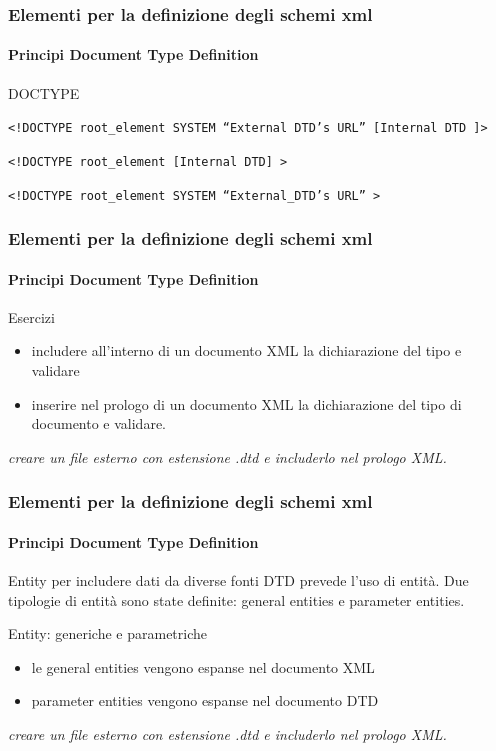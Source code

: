\begin{frame}
    \frametitle{Elementi per la definizione degli schemi xml}
    \framesubtitle{Principi Document Type Definition}
    \addtocounter{nframe}{1}

    \begin{block}{DOCTYPE}
    \begin{center}\texttt{<!DOCTYPE root_element SYSTEM ``External DTD’s URL'' [Internal DTD ]>}\end{center}
    \begin{center}\texttt{<!DOCTYPE root_element [Internal DTD] >}\end{center}
    \begin{center}\texttt{<!DOCTYPE root_element SYSTEM “External_DTD’s URL” >}\end{center}
        
    \end{block}
    
\end{frame}

\begin{frame}
    \frametitle{Elementi per la definizione degli schemi xml}
    \framesubtitle{Principi Document Type Definition}
    \addtocounter{nframe}{1}

    \begin{block}{Esercizi}
    \begin{itemize}
        \item includere all'interno di un documento XML la dichiarazione del tipo e validare
        \item inserire nel prologo di un documento XML la dichiarazione del tipo di documento e validare.
    \end{itemize}
    \end{block}
    \textit{creare un file esterno con estensione .dtd e includerlo nel prologo XML.}
    
\end{frame}

\begin{frame}
    \frametitle{Elementi per la definizione degli schemi xml}
    \framesubtitle{Principi Document Type Definition}
    \addtocounter{nframe}{1}

    \begin{block}{Entity}
        per includere dati da diverse fonti DTD prevede l'uso di entità. Due tipologie di entità sono state definite: general entities e parameter entities.
    \end{block}

    \begin{block}{Entity: generiche e parametriche}
    \begin{itemize}
        \item le general entities vengono espanse nel documento XML
        \item parameter entities vengono espanse nel documento DTD
    \end{itemize}
    \end{block}
    \textit{creare un file esterno con estensione .dtd e includerlo nel prologo XML.}
    
\end{frame}

